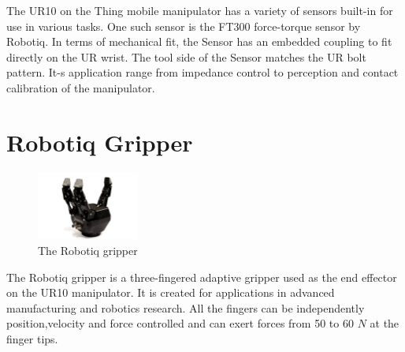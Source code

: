 \documentclass[times, utf8, diplomski, english]{fer}
\begin{document}
The UR10 on the Thing mobile manipulator has a variety of sensors built-in for use in various tasks.
One such sensor is the FT300 force-torque sensor by Robotiq.
In terms of mechanical fit, the Sensor has an embedded coupling to fit directly on the UR wrist. The tool side of the Sensor matches the UR bolt pattern. 
It-s application range from impedance control to perception and contact calibration of the manipulator.


\section{Robotiq Gripper}
\begin{figure}[h]
\centering
\includegraphics[width=0.3\textwidth]{robotiq}
\caption{The Robotiq gripper}
\end{figure}
The Robotiq gripper is a three-fingered adaptive gripper used as the end effector on the UR10 manipulator.
It is created for applications in advanced manufacturing and robotics research. 
All the fingers can be independently position,velocity and force controlled and can exert forces from 50 to 60 $N$ at the finger tips.
\end{document}
